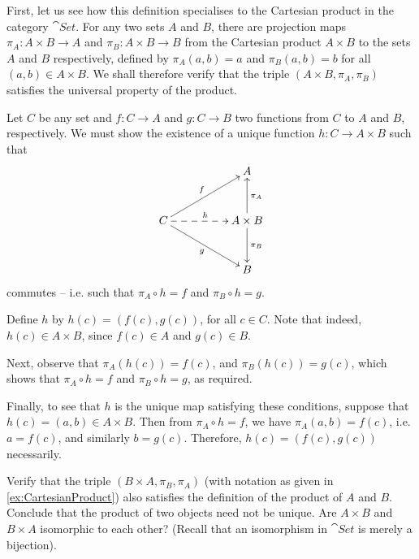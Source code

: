 \begin{Example}\label{ex:CartesianProduct}
First, let us see how this definition specialises to the Cartesian product in the category $\cat{Set}$. For any two sets $A$ and $B$, there are projection maps $\pi_A \colon A \times B \to A$ and $\pi_B \colon A \times B \to B$ from the Cartesian product $A \times B$ to the sets $A$ and $B$ respectively, defined by $\pi_A(a, b) = a$ and $\pi_B(a, b) = b$ for all $(a, b) \in A \times B$. We shall therefore verify that the triple $(A \times B, \pi_A, \pi_B)$ satisfies the universal property of the product.

Let $C$ be any set and $f \colon C \to A$ and $g \colon C \to B$ two functions from $C$ to $A$ and $B$, respectively. We must show the existence of a unique function $h \colon C \to A \times B$ such that
\begin{equation*}
\xymatrix@=3em@C=5em{
& A \\
C \ar[ru]^f \ar[rd]_g \ar@{-->}[r]^h & A \times B \ar[u]_{\pi_A} \ar[d]^{\pi_B}\\
& B
}
\end{equation*}
commutes -- i.e. such that $\pi_A \circ h = f$ and $\pi_B \circ h = g$.

Define $h$ by $h(c) = (f(c), g(c))$, for all $c \in C$. Note that indeed, $h(c) \in A \times B$, since $f(c) \in A$ and $g(c) \in B$.

Next, observe that $\pi_A(h(c)) = f(c)$, and $\pi_B(h(c)) = g(c)$, which shows that $\pi_A \circ h = f$ and $\pi_B \circ h = g$, as required.

Finally, to see that $h$ is the unique map satisfying these conditions, suppose that $h(c) = (a, b) \in A \times B$. Then from $\pi_A \circ h = f$, we have $\pi_A(a, b) = f(c)$, i.e. $a = f(c)$, and similarly $b = g(c)$. Therefore, $h(c) = (f(c), g(c))$ necessarily.
\end{Example}

\begin{Exercise}
Verify that the triple $(B \times A, \pi_B, \pi_A)$ (with notation as given in \cref{ex:CartesianProduct}) also satisfies the definition of the product of $A$ and $B$. Conclude that the product of two objects need not be unique. Are $A \times B$ and $B \times A$ isomorphic to each other? (Recall that an isomorphism in $\cat{Set}$ is merely a bijection).
\end{Exercise}

